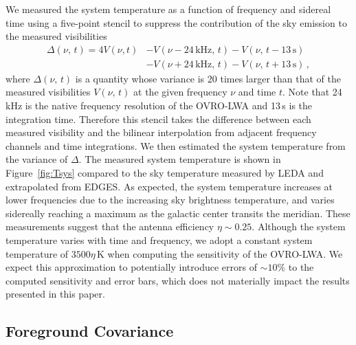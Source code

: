 \begin{bibunit}
We measured the system temperature as a function of frequency and sidereal time using a five-point
stencil to suppress the contribution of the sky emission to the measured visibilities
\begin{align*}
    \Delta(\nu,\,t) = 4V(\nu, t)
                     &- V(\nu - 24\,\text{kHz},\,t)
                      - V(\nu,\,t - 13\,\text{s}) \\
                     &- V(\nu + 24\,\text{kHz},\,t)
                      - V(\nu,\,t + 13\,\text{s})\,,
\end{align*}
where $\Delta(\nu,\,t)$ is a quantity whose variance is 20 times larger than that of the measured
visibilities $V(\nu,\,t)$ at the given frequency $\nu$ and time $t$. Note that 24\,kHz is the native
frequency resolution of the OVRO-LWA and 13\,s is the integration time.  Therefore this stencil
takes the difference between each measured visibility and the bilinear interpolation from adjacent
frequency channels and time integrations. We then estimated the system temperature from the variance
of $\Delta$. The measured system temperature is shown in Figure~\ref{fig:Tsys} compared to the sky
temperature measured by LEDA and extrapolated from EDGES.  As expected, the system temperature
increases at lower frequencies due to the increasing sky brightness temperature, and varies
sidereally reaching a maximum as the galactic center transits the meridian. These measurements
suggest that the antenna efficiency $\eta \sim 0.25$. Although the system temperature varies with
time and frequency, we adopt a constant system temperature of $3500\eta\,\text{K}$ when computing
the sensitivity of the OVRO-LWA. We expect this approximation to potentially introduce errors of
$\sim 10\%$ to the computed sensitivity and error bars, which does not materially impact the results
presented in this paper.

\subsection{Foreground Covariance}\label{sec:foreground-covariance}


\end{bibunit}
